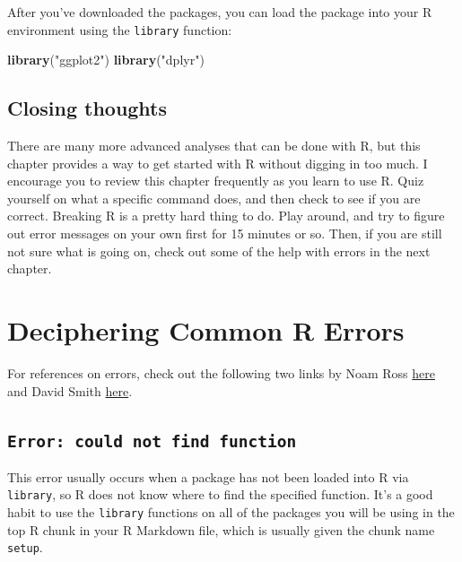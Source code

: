 \documentclass[]{tufte-book}
\newenvironment{Shaded}{\begin{snugshade}}{\end{snugshade}}
\newcommand{\FunctionTok}[1]{\textcolor[rgb]{0.13,0.29,0.53}{\textbf{#1}}}
\newcommand{\NormalTok}[1]{#1}
\newcommand{\StringTok}[1]{\textcolor[rgb]{0.31,0.60,0.02}{#1}}
\begin{document}
After you've downloaded the packages, you can load the package into your R environment using the \texttt{library} function:

\begin{Shaded}
\begin{Highlighting}[]
\FunctionTok{library}\NormalTok{(}\StringTok{"ggplot2"}\NormalTok{)}
\FunctionTok{library}\NormalTok{(}\StringTok{"dplyr"}\NormalTok{)}
\end{Highlighting}
\end{Shaded}

\section{Closing thoughts}\label{closing-thoughts}

There are many more advanced analyses that can be done with R, but this chapter provides a way to get started with R without digging in too much. I encourage you to review this chapter frequently as you learn to use R. Quiz yourself on what a specific command does, and then check to see if you are correct. Breaking R is a pretty hard thing to do. Play around, and try to figure out error messages on your own first for 15 minutes or so. Then, if you are still not sure what is going on, check out some of the help with errors in the next chapter.

\chapter{Deciphering Common R Errors}\label{errors}

For references on errors, check out the following two links by Noam Ross \href{https://github.com/noamross/zero-dependency-problems/blob/master/misc/stack-overflow-common-r-errors.md}{here} and David Smith \href{http://blog.revolutionanalytics.com/2015/03/the-most-common-r-error-messages.html}{here}.

\section{\texorpdfstring{\texttt{Error:\ could\ not\ find\ function}}{Error: could not find function}}\label{error-could-not-find-function}

This error usually occurs when a package has not been loaded into R via \texttt{library}, so R does not know where to find the specified function. It's a good habit to use the \texttt{library} functions on all of the packages you will be using in the top R chunk in your R Markdown file, which is usually given the chunk name \texttt{setup}.
\end{document}
